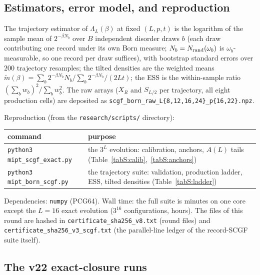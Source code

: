 \documentclass[aps,prx,reprint,superscriptaddress,nobibnotes,longbibliography]{revtex4-2}
\begin{document}
\subsection{Estimators, error model, and reproduction}

The trajectory estimator of $\Lambda_L(\beta)$ at fixed $(L,p,t)$ is the
logarithm of the sample mean of $2^{-\beta N_b}$ over $B$ independent
disorder draws $b$ (each draw contributing one record under its own Born
measure; $N_b=N_{\rm rand}(\omega_b)$ is $\omega_b$-measurable, so one
record per draw suffices), with bootstrap standard errors over $200$
trajectory resamples; the tilted densities are the weighted means
$\tilde m(\beta)=\sum_b2^{-\beta N_b}N_b/\sum_b2^{-\beta N_b}/(2Lt)$; the
ESS is the within-sample ratio
$(\sum_bw_b)^2/\sum_bw_b^2$.  The raw arrays ($X_R$ and $S_{L/2}$ per
trajectory, all eight production cells) are deposited as
\texttt{scgf\_born\_raw\_L\{8,12,16,24\}\_p\{16,22\}.npz}.

Reproduction (from the \texttt{research/scripts/} directory):
\begin{center}
\begin{tabular}{ll}
command & purpose\\
\hline
\texttt{python3 mipt\_scgf\_exact.py} & the $3^L$ evolution: calibration,
anchors, $A(L)$ tails (Table~\ref{tabS:calib},~\ref{tabS:anchors})\\
\texttt{python3 mipt\_born\_scgf.py} & the trajectory suite: validation,
production ladder, ESS, tilted densities
(Table~\ref{tabS:ladder})\\
\end{tabular}
\end{center}
Dependencies: \texttt{numpy} (PCG64).  Wall time: the full suite is
minutes on one core except the $L=16$ exact evolution ($3^{16}$
configurations, hours).  The files of this round are hashed in
\texttt{certificate\_sha256\_v8.txt} (round files) and
\texttt{certificate\_sha256\_v3\_scgf.txt} (the parallel-line ledger of
the record-SCGF suite itself).


\subsection{The v22 exact-closure runs}
\label{sm:v22closure}
\end{document}
